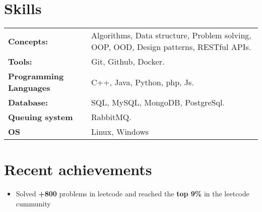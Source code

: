\documentclass[a4,10pt]{article}
\newenvironment{zitemize}{
\begin{itemize}\itemsep0pt \parskip0pt \parsep1pt}
{\end{itemize}\vspace{-0.5cm}}
\newcommand{\hskills}[1]{
\textbf{\bfseries #1} }
\begin{document}
\section{Skills}
\begin{tabular}{p{14em} p{48em}}
\hskills{Concepts:} &  Algorithms, Data structure, Problem solving, OOP, OOD, Design
patterns, RESTful APIs. \\
\hskills{Tools:} & Git, Github, Docker.  \\
\hskills{Programming Languages} & C++, Java, Python, php, Js. \\
\hskills{Database:} & SQL, MySQL, MongoDB, PostgreSql. \\
\hskills{Queuing system} & RabbitMQ. \\
\hskills{OS} & Linux, Windows \\
\end{tabular}
\vspace{-0.2cm}


\section{Recent achievements} 
\renewcommand\refname{\vskip -1.5em}
\begin{zitemize}
    \item Solved \textbf{+800} problems in leetcode and reached the \textbf{top 9\%} in the
    leetcode cummunity
\end{zitemize}
\printbibliography[heading=none]
\vspace{-0.4cm}


\end{document}
